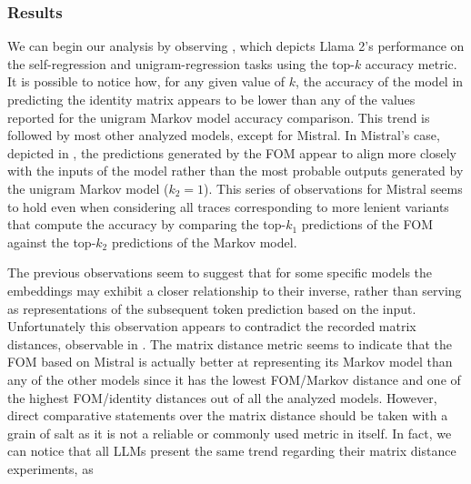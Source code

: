 
\subsubsection{Results}

We can begin our analysis by observing , which depicts Llama 2's performance on the self-regression and unigram-regression tasks using the top-$k$ accuracy metric.
It is possible to notice how, for any given value of $k$, the accuracy of the model in predicting the identity matrix appears to be lower than any of the values reported for the unigram Markov model accuracy comparison.
This trend is followed by most other analyzed models, except for Mistral.
In Mistral's case, depicted in , the predictions generated by the FOM appear to align more closely with the inputs of the model rather than the most probable outputs generated by the unigram Markov model ($k_2 = 1$).
This series of observations for Mistral seems to hold even when considering all traces corresponding to more lenient variants that compute the accuracy by comparing the top-$k_1$ predictions of the FOM against the top-$k_2$ predictions of the Markov model.

The previous observations seem to suggest that for some specific models the embeddings may exhibit a closer relationship to their inverse, rather than serving as representations of the subsequent token prediction based on the input. 
Unfortunately this observation appears to contradict the recorded matrix distances, observable in .
The matrix distance metric seems to indicate that the FOM based on Mistral is actually better at representing its Markov model than any of the other models since it has the lowest FOM/Markov distance and one of the highest FOM/identity distances out of all the analyzed models.
However, direct comparative statements over the matrix distance should be taken with a grain of salt as it is not a reliable or commonly used metric in itself.
In fact, we can notice that all LLMs present the same trend regarding their matrix distance experiments, as 


